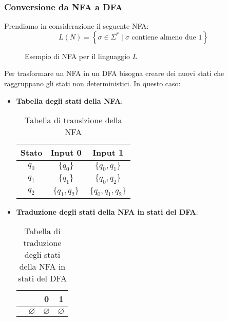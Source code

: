 \documentclass[a4paper]{article}
\begin{document}
\subsubsection{Conversione da NFA a DFA}
Prendiamo in considerazione il seguente NFA:
  \[
  L(N) = \left\{ \sigma \in \Sigma^* \;\left|\; \sigma \text{ contiene almeno due } 1 \right. \right\}
  \] 
\begin{figure}[H]
  \centering
  \caption{Esempio di NFA per il linguaggio \( L \)}
\end{figure}
\noindent
Per trasformare un NFA in un DFA bisogna creare dei nuovi stati che raggruppano
gli stati non deterministici. In questo caso:
\begin{itemize}
  \item \textbf{Tabella degli stati della NFA}:
    \begin{table}[H]
      \centering
      \begin{tabular}{|c|c|c|}
        \hline
        Stato & Input 0 & Input 1\\
        \hline
        \( q_0 \) & \( \{q_0\} \) & \( \{q_0, q_1\} \)\\
        \( q_1 \) & \( \{q_1\} \) & \( \{q_0, q_2\} \)\\
        \( q_2 \) & \( \{q_1, q_2\} \) & \( \{q_0, q_1, q_2\} \)\\
        \hline
      \end{tabular}
      \caption{Tabella di transizione della NFA}
    \end{table}

  \item \textbf{Traduzione degli stati della NFA in stati del DFA}:
    \begin{table}[H]
      \centering
      \begin{tabular}{|c|c|c|c|}
        \hline
        & & 0 & 1 \\
        \hline
        & \( \varnothing \) & \( \varnothing \) & \( \varnothing \) \\

      \end{tabular}
      \caption{Tabella di traduzione degli stati della NFA in stati del DFA}
    \end{table}
\end{itemize}
\end{document}
